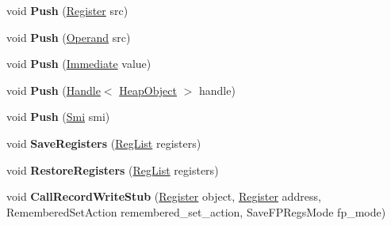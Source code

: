 \begin{DoxyCompactItemize}
void {\bfseries Push} (\mbox{\hyperlink{classv8_1_1internal_1_1Register}{Register}} src)
\item 
\mbox{\label{classv8_1_1internal_1_1TurboAssembler_ae100e193840e65bdd4b1e59f07ddcac1}} 
void {\bfseries Push} (\mbox{\hyperlink{classv8_1_1internal_1_1Operand}{Operand}} src)
\item 
\mbox{\label{classv8_1_1internal_1_1TurboAssembler_a7b9d4f2be64c70f161a14eaffa4ec653}} 
void {\bfseries Push} (\mbox{\hyperlink{classv8_1_1internal_1_1Immediate}{Immediate}} value)
\item 
\mbox{\label{classv8_1_1internal_1_1TurboAssembler_a5524deaafc5f8d02a285a17deb639215}} 
void {\bfseries Push} (\mbox{\hyperlink{classv8_1_1internal_1_1Handle}{Handle}}$<$ \mbox{\hyperlink{classv8_1_1internal_1_1HeapObject}{Heap\+Object}} $>$ handle)
\item 
\mbox{\label{classv8_1_1internal_1_1TurboAssembler_aefc3cd9bb0e7e5183140d11765e18493}} 
void {\bfseries Push} (\mbox{\hyperlink{classv8_1_1internal_1_1Smi}{Smi}} smi)
\item 
\mbox{\label{classv8_1_1internal_1_1TurboAssembler_adb2676d473b8bdff1c6856758eabfa71}} 
void {\bfseries Save\+Registers} (\mbox{\hyperlink{classuint32__t}{Reg\+List}} registers)
\item 
\mbox{\label{classv8_1_1internal_1_1TurboAssembler_a1ff5e6044d8b7223b66061f3ed4123f1}} 
void {\bfseries Restore\+Registers} (\mbox{\hyperlink{classuint32__t}{Reg\+List}} registers)
\item 
\mbox{\label{classv8_1_1internal_1_1TurboAssembler_ab10280acd4d7aebd053a430cbea68fb1}} 
void {\bfseries Call\+Record\+Write\+Stub} (\mbox{\hyperlink{classv8_1_1internal_1_1Register}{Register}} object, \mbox{\hyperlink{classv8_1_1internal_1_1Register}{Register}} address, Remembered\+Set\+Action remembered\+\_\+set\+\_\+action, Save\+F\+P\+Regs\+Mode fp\+\_\+mode)
\item 
\mbox{\label{classv8_1_1internal_1_1TurboAssembler_a2bc1271b1999cb2ee3784489515931b6}} 

\end{DoxyCompactItemize}

